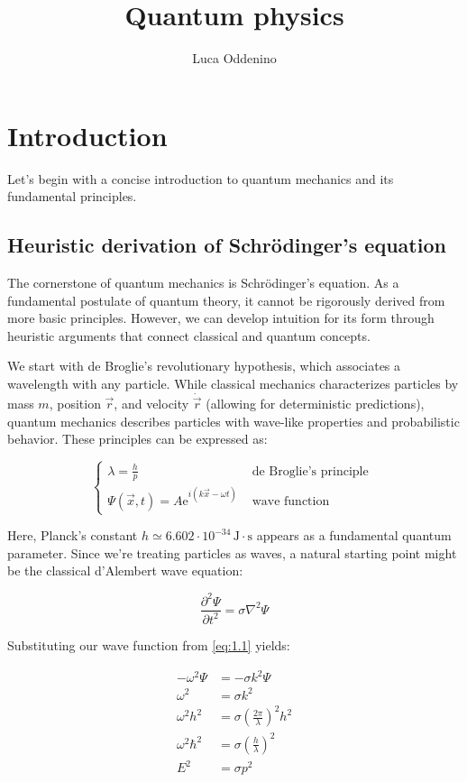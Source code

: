 \documentclass[italian]{HKNdocument}
\title{Quantum physics}
\author{Luca Oddenino}
\begin{document}
\frontmatter
\maketitle

\tableofcontents
\clearpage
\mainmatter

\section{Introduction}
Let's begin with a concise introduction to quantum mechanics and its fundamental principles.

\subsection{Heuristic derivation of Schrödinger's equation}
The cornerstone of quantum mechanics is Schrödinger's equation. As a fundamental postulate of quantum theory, it cannot be rigorously derived from more basic principles. However, we can develop intuition for its form through heuristic arguments that connect classical and quantum concepts.

We start with de Broglie's revolutionary hypothesis, which associates a wavelength with any particle. While classical mechanics characterizes particles by mass $m$, position $\vec{r}$, and velocity $\dot{\vec{r}}$ (allowing for deterministic predictions), quantum mechanics describes particles with wave-like properties and probabilistic behavior. These principles can be expressed as:

\[
\begin{cases}\lambda=\frac{h}{p} & \text { de Broglie's principle }  \label{eq:1.1}\\ \Psi(\vec{x}, t)=A \mathrm{e}^{i(k \vec{x}-\omega t)} & \text { wave function }\end{cases}
\]

Here, Planck's constant $h \simeq 6.602 \cdot 10^{-34} \, \mathrm{J} \cdot \mathrm{s}$ appears as a fundamental quantum parameter. Since we're treating particles as waves, a natural starting point might be the classical d'Alembert wave equation:

\begin{equation}
\frac{\partial^{2} \Psi}{\partial t^{2}}=\sigma \nabla^{2} \Psi \label{eq:1.2}
\end{equation}

Substituting our wave function from \eqref{eq:1.1} yields:

\begin{align}
-\omega^{2} \Psi & =-\sigma k^{2} \Psi \\
\omega^{2} & =\sigma k^{2} \\
\omega^{2} h^{2} & =\sigma\left(\frac{2 \pi}{\lambda}\right)^{2} h^{2}  \label{eq:1.3}\\
\omega^{2} \hbar^{2} & =\sigma\left(\frac{h}{\lambda}\right)^{2} \\
E^{2} & =\sigma p^{2}
\end{align}
\end{document}
